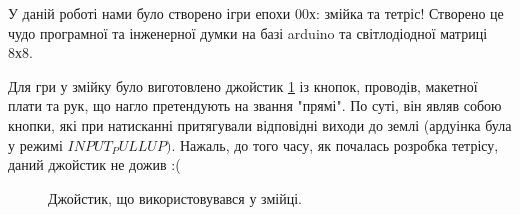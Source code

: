 
У даній роботі нами було створено ігри епохи 00х: змійка та тетріс!
Створено це чудо програмної та інженерної думки на базі arduino та світлодіодної матриці 8х8.

Для гри у змійку було виготовлено джойстик \ref{joy} із кнопок, проводів, макетної плати та рук, що нагло претендують на звання "прямі".
По суті, він являв собою кнопки, які при натисканні притягували відповідні виходи до землі (ардуінка була у режимі $INPUT_PULLUP)$.
Нажаль, до того часу, як почалась розробка тетрісу, даний джойстик не дожив :(

\begin{figure}[h]
\caption{Джойстик, що використовувався у змійці.}
\label{joy}
\end{figure}